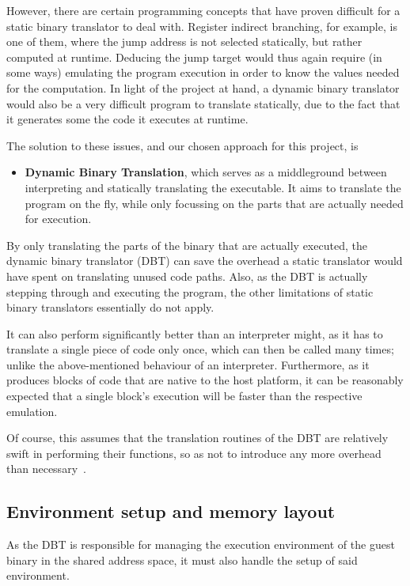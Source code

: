 However, there are certain programming concepts that have proven difficult for a static binary translator to deal with.
Register indirect branching, for example, is one of them, where the jump address is not selected statically, but rather computed at runtime.
Deducing the jump target would thus again require (in some ways) emulating the program execution in order to know the values needed for the computation.
In light of the project at hand, a dynamic binary translator would also be a very difficult program to translate statically, due to the fact that it generates some the code it executes at runtime.

The solution to these issues, and our chosen approach for this project, is
\begin{itemize}
	\item \textbf{Dynamic Binary Translation}, which serves as a middleground between interpreting and statically translating the executable.
	It aims to translate the program on the fly, while only focussing on the parts that are actually needed for execution.
\end{itemize}

By only translating the parts of the binary that are actually executed, the dynamic binary translator (DBT) can save the overhead a static translator would have spent on translating unused code paths.
Also, as the DBT is actually stepping through and executing the program, the other limitations of static binary translators essentially do not apply.

It can also perform significantly better than an interpreter might, as it has to translate a single piece of code only once, which can then be called many times; unlike the above-mentioned behaviour of an interpreter.
Furthermore, as it produces blocks of code that are native to the host platform, it can be reasonably expected that a single block's execution will be faster than the respective emulation.

Of course, this assumes that the translation routines of the DBT are relatively swift in performing their functions, so as not to introduce any more overhead than necessary~\cite[S. 1f]{bintrans}.


\subsection{Environment setup and memory layout}
As the DBT is responsible for managing the execution environment of the guest binary in the shared address space, it must also handle the setup of said environment.

